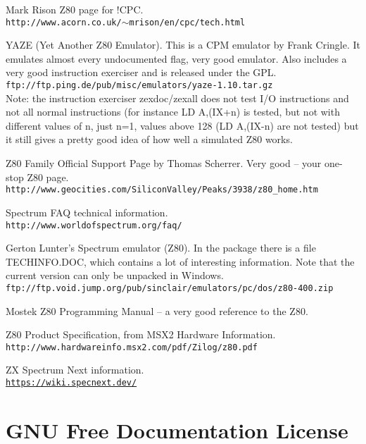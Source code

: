 \documentclass[twoside,openright,a4paper]{book}
\begin{document}
\begin{thebibliography}{}

	  Mark Rison Z80 page for !CPC. \\
	{\tt \small http://www.acorn.co.uk/$\sim$mrison/en/cpc/tech.html}

	 YAZE (Yet Another Z80 Emulator). This is a CPM emulator by Frank Cringle. It emulates almost every undocumented flag, very good emulator. Also includes a very good instruction exerciser and is released under the GPL. \\
	{\tt \small ftp://ftp.ping.de/pub/misc/emulators/yaze-1.10.tar.gz} \\
	Note: the instruction exerciser zexdoc/zexall does not test I/O instructions and not all normal instructions (for instance LD A,(IX+n) is tested, but not with different values of n, just n=1, values above 128 (LD A,(IX-n) are not tested) but it still gives a pretty good idea of how well a simulated Z80 works.

	 Z80 Family Official Support Page by Thomas Scherrer. Very good -- your one-stop Z80 page. \\
	{\tt \small http://www.geocities.com/SiliconValley/Peaks/3938/z80\_home.htm}

	 Spectrum FAQ technical information. \\
	{\tt \small http://www.worldofspectrum.org/faq/}

	 Gerton Lunter's Spectrum emulator (Z80). In the package there is a file TECHINFO.DOC, which contains a lot of interesting information. Note that the current version can only be unpacked in Windows. \\
	{\tt \small ftp://ftp.void.jump.org/pub/sinclair/emulators/pc/dos/z80-400.zip}

	 Mostek Z80 Programming Manual -- a very good reference to the Z80.

	 Z80 Product Specification, from MSX2 Hardware Information. \\
	{\tt \small http://www.hardwareinfo.msx2.com/pdf/Zilog/z80.pdf}

	 ZX Spectrum Next information. \\
	{\tt \small \url{https://wiki.specnext.dev/}}

\end{thebibliography}




\chapter{GNU Free Documentation License}
\label{gfdl}
\end{document}
